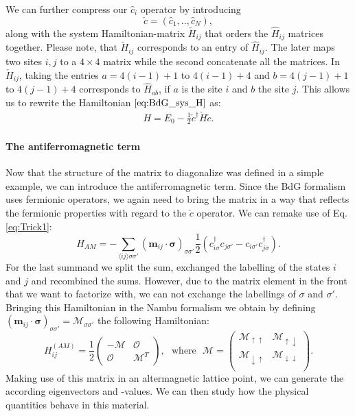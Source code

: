 \documentclass[../main.tex]{subfile}
\begin{document}
We can further compress our $\hat{c}_i$ operator by introducing 
\[
    \check{c} = (\hat{c}_1,..,\hat{c}_N),
\] 
along with the system Hamiltonian-matrix $\check{H}_{ij}$ that orders the $\hat{H}_{ij}$ matrices together.  
Please note, that $\check{H}_{ij}$ corresponds to an entry of $\hat{H}_{ij}$. The later maps two sites $i,j$ to a $4\times4$ matrix while the second concatenate all the matrices.
In $\check{H}_{ij}$, taking the entries $a=4(i-1) + 1$ to $4(i-1) + 4$ and $b=4(j-1) + 1$ to $4(j-1) + 4$ corresponds to $\hat{H}_{ab}$, if $a$ is the site $i$ and $b$ the site $j$.
This allows us to rewrite the Hamiltonian $\ref{eq:BdG_sys_H}$ as:
\begin{align}
    H = E_0 - \frac{1}{2} \check{c}^\dagger \check{H} \check{c}.
\end{align}

\paragraph{The antiferromagnetic term}$~$\\

Now that the structure of the matrix to diagonalize was defined in a simple example, we can introduce the antiferromagnetic term. 
Since the BdG formalism uses fermionic operators, we again need to bring the matrix in a way that reflects the fermionic properties with regard to the $\check{c}$ operator.
We can remake use of Eq. \ref{eq:Trick1}:
\begin{equation*}
    H_{AM} = -\sum_{\langle i j\rangle\sigma\sigma'} \left(\bm{m}_{ij} \cdot \bm{\sigma}\right)_{\sigma\sigma'} \frac{1}{2}\left(c_{i\sigma}^{\dagger} c_{j\sigma'} - c_{i\sigma'}c_{j\sigma}^{\dagger}\right).
\end{equation*}
For the last summand we split the sum, exchanged the labelling of the states $i$ and $j$ and recombined the sums. However, due to the matrix element in the front
that we want to factorize with, we can not exchange the labellings of $\sigma$ and $\sigma'$.
Bringing this Hamiltonian in the Nambu formalism we obtain by defining
$\left(\bm{m}_{ij} \cdot \bm{\sigma}\right)_{\sigma\sigma'} = \mathcal{M}_{\sigma\sigma'}$ 
the following Hamiltonian:
\begin{equation*}
    H^{(AM)}_{ij} = \frac{1}{2}\begin{pmatrix}
        -\mathcal{M} & \mathcal{O}\\
        \mathcal{O} & \mathcal{M}^T
    \end{pmatrix}
    ,~~~ \text{where} ~~~ \mathcal{M} = \begin{pmatrix}
        \mathcal{M}_{\uparrow\uparrow} & \mathcal{M}_{\uparrow\downarrow}\\
        \mathcal{M}_{\downarrow\uparrow} & \mathcal{M}_{\downarrow\downarrow}\\
    \end{pmatrix}.
\end{equation*}
Making use of this matrix in an altermagnetic lattice point, we can generate the according eigenvectors and -values. We can then study how the physical quantities 
behave in this material.\\
\end{document}
